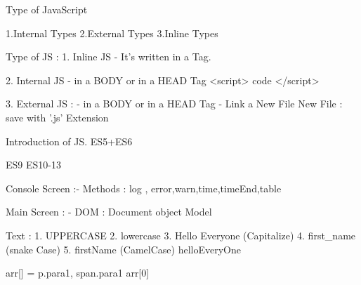 Type of JavaScript

1.Internal Types
2.External Types
3.Inline Types


Type of JS : 
1. Inline JS
    - It's written in a Tag.

2. Internal JS
    - in a BODY or in a HEAD Tag
    <script> code </script>

3. External JS : 
    - in a BODY or in a HEAD Tag
    - Link a New File
    New File : save with '.js' Extension



Introduction of JS.
    ES5+ES6

    ES9
    ES10-13


Console Screen :-
    Methods : 
        log , error,warn,time,timeEnd,table



Main Screen : 
    - DOM :
        Document object Model



Text : 
    1. UPPERCASE
    2. lowercase
    3. Hello Everyone  (Capitalize)
    4. first_name (snake Case)
    5. firstName (CamelCase)   helloEveryOne



arr[] =  {p.para1, span.para1} 
arr[0]
